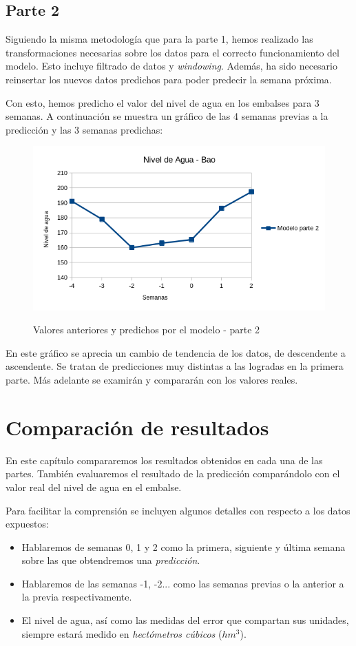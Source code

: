 \documentclass[12pt]{report} %
\begin{document}
\section{Parte 2}

Siguiendo la misma metodología que para la parte 1, hemos realizado las transformaciones necesarias sobre los datos para el correcto funcionamiento del modelo. Esto incluye filtrado de datos y \textit{windowing}. Además, ha sido necesario reinsertar los nuevos datos predichos para poder predecir la semana próxima.

Con esto, hemos predicho el valor del nivel de agua en los embalses para 3 semanas. A continuación se muestra un gráfico de las 4 semanas previas a la predicción y las 3 semanas predichas:

\begin{figure}[H]
    \includegraphics[width=0.85\linewidth]{predict-2-bao.png}\\
    \caption{\small Valores anteriores y  predichos por el modelo - parte 2}
\end{figure}

En este gráfico se aprecia un cambio de tendencia de los datos, de descendente a ascendente. Se tratan de predicciones muy distintas a las logradas en la primera parte. Más adelante se examirán y compararán con los valores reales.

\chapter{Comparación de resultados}
\label{chap:result-comparing}
En este capítulo compararemos los resultados obtenidos en cada una de las partes. También evaluaremos el resultado de la predicción comparándolo con el valor real del nivel de agua en el embalse.

Para facilitar la comprensión se incluyen algunos detalles con respecto a los datos expuestos:
\begin{itemize}
    \item Hablaremos de semanas 0, 1 y 2 como la primera, siguiente y última semana sobre las que obtendremos una \textit{predicción}.
    \item Hablaremos de las semanas -1, -2... como las semanas previas o la anterior a la previa respectivamente.
    \item El nivel de agua, así como las medidas del error que compartan sus unidades, siempre estará medido en \textit{hectómetros cúbicos} ($hm^3$).
\end{itemize}
\end{document}
